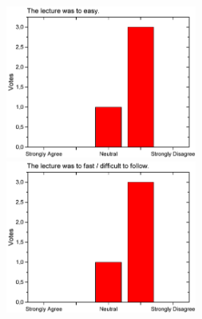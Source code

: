 \begin{figure}[h!]
\begin{minipage}{.48\linewidth}
      {\includegraphics[height=50mm]{figures/n/Graph35.pdf}}
      {\includegraphics[height=50mm]{figures/n/Graph36.pdf}}
  \end{minipage}
\end{figure}

